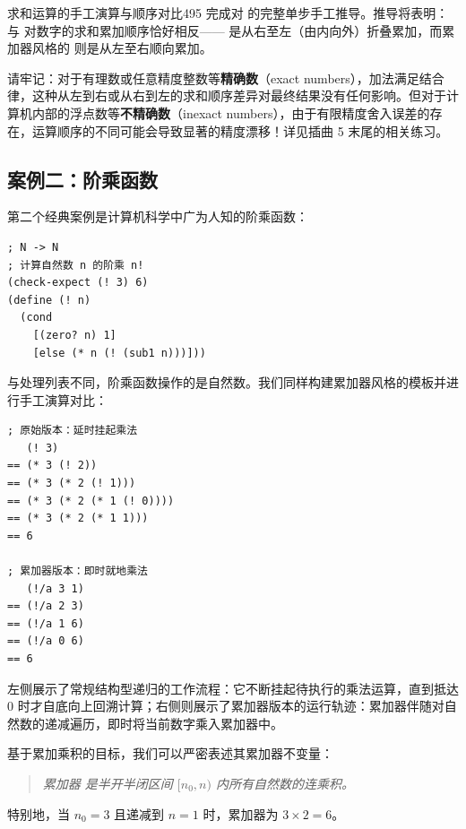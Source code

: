 \begin{exercise}{求和运算的手工演算与顺序对比}{495}
完成对  的完整单步手工推导。推导将表明： 与  对数字的求和累加顺序恰好相反—— 是从右至左（由内向外）折叠累加，而累加器风格的  则是从左至右顺向累加。
\end{exercise}

\begin{notebox}[关于数值计算精度的警示]
请牢记：对于有理数或任意精度整数等\textbf{精确数}（exact numbers），加法满足结合律，这种从左到右或从右到左的求和顺序差异对最终结果没有任何影响。但对于计算机内部的浮点数等\textbf{不精确数}（inexact numbers），由于有限精度舍入误差的存在，运算顺序的不同可能会导致显著的精度漂移！详见插曲 5 末尾的相关练习。
\end{notebox}

\subsection{案例二：阶乘函数}

第二个经典案例是计算机科学中广为人知的阶乘函数：

\begin{lstlisting}[language=BSL]
; N -> N
; 计算自然数 n 的阶乘 n!
(check-expect (! 3) 6)
(define (! n)
  (cond
    [(zero? n) 1]
    [else (* n (! (sub1 n)))]))
\end{lstlisting}

与处理列表不同，阶乘函数操作的是自然数。我们同样构建累加器风格的模板并进行手工演算对比：

\begin{lstlisting}[language=BSL]
; 原始版本：延时挂起乘法
   (! 3)
== (* 3 (! 2))
== (* 3 (* 2 (! 1)))
== (* 3 (* 2 (* 1 (! 0))))
== (* 3 (* 2 (* 1 1)))
== 6

; 累加器版本：即时就地乘法
   (!/a 3 1)
== (!/a 2 3)
== (!/a 1 6)
== (!/a 0 6)
== 6
\end{lstlisting}

左侧展示了常规结构型递归的工作流程：它不断挂起待执行的乘法运算，直到抵达 0 时才自底向上回溯计算；右侧则展示了累加器版本的运行轨迹：累加器伴随对自然数的递减遍历，即时将当前数字乘入累加器中。

基于累加乘积的目标，我们可以严密表述其累加器不变量：
\begin{quote}
\textit{累加器  是半开半闭区间 $[n_0, n)$ 内所有自然数的连乘积。}
\end{quote}
特别地，当 $n_0 = 3$ 且递减到 $n = 1$ 时，累加器为 $3 \times 2 = 6$。

